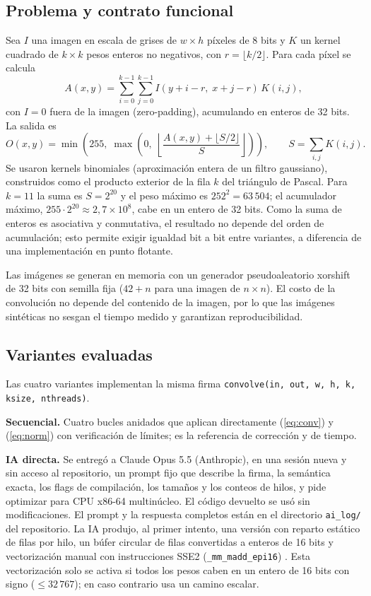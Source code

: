 \documentclass[12pt]{article}
\begin{document}
\subsection{Problema y contrato funcional}
Sea $I$ una imagen en escala de grises de $w \times h$ píxeles de 8 bits y $K$ un kernel cuadrado de $k \times k$ pesos enteros no negativos, con $r = \lfloor k/2 \rfloor$. Para cada píxel se calcula
\begin{equation}
A(x,y) = \sum_{i=0}^{k-1} \sum_{j=0}^{k-1} I(y+i-r,\; x+j-r)\, K(i,j),
\label{eq:conv}
\end{equation}
con $I = 0$ fuera de la imagen (zero-padding), acumulando en enteros de 32 bits. La salida es
\begin{equation}
O(x,y) = \min\!\left(255,\; \max\!\left(0,\; \left\lfloor \frac{A(x,y) + \lfloor S/2 \rfloor}{S} \right\rfloor\right)\right), \qquad S = \sum_{i,j} K(i,j).
\label{eq:norm}
\end{equation}
Se usaron kernels binomiales (aproximación entera de un filtro gaussiano), construidos como el producto exterior de la fila $k$ del triángulo de Pascal. Para $k = 11$ la suma es $S = 2^{20}$ y el peso máximo es $252^2 = 63\,504$; el acumulador máximo, $255 \cdot 2^{20} \approx 2{,}7 \times 10^8$, cabe en un entero de 32 bits. Como la suma de enteros es asociativa y conmutativa, el resultado no depende del orden de acumulación; esto permite exigir igualdad bit a bit entre variantes, a diferencia de una implementación en punto flotante.

Las imágenes se generan en memoria con un generador pseudoaleatorio xorshift de 32 bits con semilla fija ($42 + n$ para una imagen de $n \times n$). El costo de la convolución no depende del contenido de la imagen, por lo que las imágenes sintéticas no sesgan el tiempo medido y garantizan reproducibilidad.

\subsection{Variantes evaluadas}
Las cuatro variantes implementan la misma firma \texttt{convolve(in, out, w, h, k, ksize, nthreads)}.

\textbf{Secuencial.} Cuatro bucles anidados que aplican directamente (\ref{eq:conv}) y (\ref{eq:norm}) con verificación de límites; es la referencia de corrección y de tiempo.

\textbf{IA directa.} Se entregó a Claude Opus 5.5 (Anthropic), en una sesión nueva y sin acceso al repositorio, un prompt fijo que describe la firma, la semántica exacta, los flags de compilación, los tamaños y los conteos de hilos, y pide optimizar para CPU x86-64 multinúcleo. El código devuelto se usó sin modificaciones. El prompt y la respuesta completos están en el directorio \texttt{ai\_log/} del repositorio. La IA produjo, al primer intento, una versión con reparto estático de filas por hilo, un búfer circular de filas convertidas a enteros de 16 bits y vectorización manual con instrucciones SSE2 (\texttt{\_mm\_madd\_epi16}) \cite{intelintrinsics}. Esta vectorización solo se activa si todos los pesos caben en un entero de 16 bits con signo ($\le 32\,767$); en caso contrario usa un camino escalar.
\end{document}
